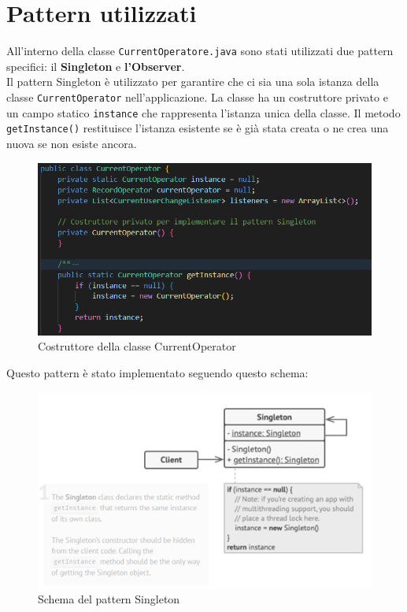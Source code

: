 \section{Pattern utilizzati}

All’interno della classe \texttt{CurrentOperatore.java} sono stati utilizzati due pattern specifici: il \textbf{Singleton} e \textbf{l’Observer}.\\
Il pattern Singleton è utilizzato per garantire che ci sia una sola istanza della classe \texttt{CurrentOperator} nell'applicazione. La classe ha un costruttore privato e un campo statico \texttt{instance}
che rappresenta l'istanza unica della classe. Il metodo \texttt{getInstance()} restituisce l'istanza esistente se è già stata creata o ne crea una nuova se non esiste ancora.
\begin{figure}[H]
    \centering
    \includegraphics[width=1\textwidth]{../../img/Singleton.png}
    \caption{Costruttore della classe CurrentOperator}
    \label{fig:Singleton}
    
\end{figure}

Questo pattern è stato implementato seguendo questo schema:
\begin{figure}[H]
    \centering
    \includegraphics[width=1\textwidth]{../../img/schema_singleton.png}
    \caption{Schema del pattern Singleton}
    \label{fig:SingletonPattern}
    
\end{figure}

